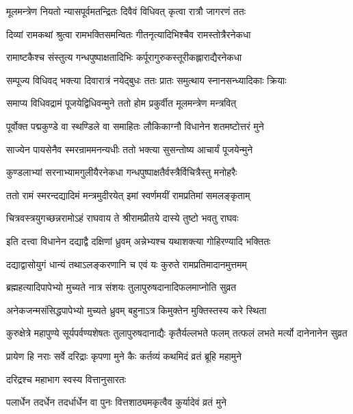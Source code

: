 \twolineshloka
{मूलमन्त्रेण नियतो न्यासपूर्वमतन्द्रितः}
{दिवैवं विधिवत् कृत्वा रात्रौ जागरणं ततः}%

\twolineshloka
{दिव्यां रामकथां श्रुत्वा रामभक्तिसमन्वितः}
{गीतनृत्यादिभिश्चैव रामस्तोत्रैरनेकधा}%

\twolineshloka
{रामाष्टकैश्च संस्तुत्य गन्धपुष्पाक्षतादिभिः}
{कर्पूरागुरुकस्तूरीकह्लाराद्यैरनेकधा}%

\twolineshloka
{सम्पूज्य विधिवद् भक्त्या दिवारात्रं नयेद्बुधः}
{ततः प्रातः समुत्थाय स्नानसन्ध्यादिकाः क्रियाः}%

\twolineshloka
{समाप्य विधिवद्रामं पूजयेद्विधिवन्मुने}
{ततो होम प्रकुर्वीत मूलमन्त्रेण मन्त्रवित्}%

\twolineshloka
{पूर्वोक्त पद्मकुण्डे वा स्थण्डिले वा समाहितः}
{लौकिकाग्नौ विधानेन शतमष्टोत्तरं मुने}%

\twolineshloka
{साज्येन पायसेनैव स्मरन्राममनन्यधीः}
{ततो भक्त्या सुसन्तोष्य आचार्यं पूजयेन्मुने}%

\twolineshloka
{कुण्डलाभ्यां सरनाभ्यामगुलीयैरनेकधा}
{गन्धपुष्पाक्षतैर्वस्त्रैर्विचित्रैस्तु मनोहरैः}%

\twolineshloka
{ततो रामं स्मरन्दद्यादिमं मन्त्रमुदीरयेत्}
{इमां स्वर्णमयीं रामप्रतिमां समलङ्कृताम्}%

\twolineshloka
{चित्रवस्त्रयुगच्छन्नरामोऽहं राघवाय ते}
{श्रीरामप्रीतये दास्ये तुष्टो भवतु राघवः}%

\twolineshloka
{इति दत्त्वा विधानेन दद्याद्वै दक्षिणां ध्रुवम्}
{अन्नेभ्यश्च यथाशक्त्या गोहिरण्यादि भक्तितः}%

\twolineshloka
{दद्याद्वासोयुगं धान्यं तथाऽलङ्करणानि च}
{एवं यः कुरुते रामप्रतिमादानमुत्तमम्}%

\twolineshloka
{ब्रह्महत्यादिपापेभ्यो मुच्यते नात्र संशयः}
{तुलापुरुषदानादिफलमाप्नोति सुव्रत}%

\twolineshloka
{अनेकजन्मसंसिद्धपापेभ्यो मुच्यते ध्रुवम्}
{बहुनाऽत्र किमुक्तेन मुक्तिस्तस्य करे स्थिता}%

\threelineshloka
{कुरुक्षेत्रे महापुण्ये सूर्यपर्वण्यशेषतः}
{तुलापुरुषदानाद्यैः कृतैर्यल्लभते फलम्}
{तत्फलं लभते मर्त्यो दानेनानेन सुव्रत}%

\twolineshloka
{प्रायेण हि नराः सर्वे दरिद्राः कृपणा मुने}
{कैः कर्तव्यं कथमिदं व्रतं ब्रूहि महामुने}%

\onelineshloka
{दरिद्रश्च महाभाग स्वस्य वित्तानुसारतः}%

\twolineshloka
{पलार्धेन तदर्धेन तदर्धार्धेन वा पुनः}
{वित्तशाठ्यमकृत्वैव कुर्यादेवं व्रतं मुने}%

